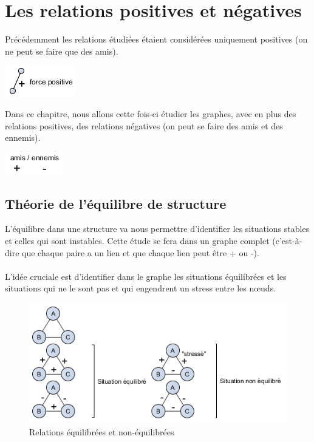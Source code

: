 \section{Les relations positives et négatives}

Précédemment les relations étudiées étaient considérées uniquement positives (on ne peut se faire que des amis). 

\includegraphics[scale=1]{images/22_force-positive}

Dans ce chapitre, nous allons cette fois-ci étudier les graphes, avec en plus des relations positives, des relations négatives (on peut se faire des amis et des ennemis).

\includegraphics[scale=1]{images/22_amis-ennemis3.png}

\subsection{Théorie de l'équilibre de structure}
L'équilibre dans une structure va nous permettre d'identifier les situations stables et celles qui sont instables. Cette étude se fera dans un graphe complet (c'est-à-dire que chaque paire a un lien et que chaque lien peut être + ou -).

\paragraph{}
L'idée cruciale est d'identifier dans le graphe les situations équilibrées et les situations qui ne le sont pas et qui engendrent un stress entre les nœuds.  

\begin{figure}[h!]
\label{equi}
\caption{Relations équilibrées et non-équilibrées}
\centering
\includegraphics[width=\textwidth]{images/22_situation.png}
\end{figure}


